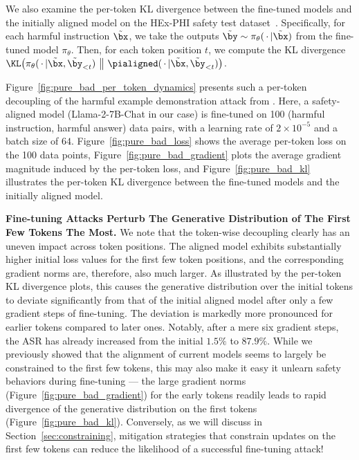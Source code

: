  
 We also examine the per-token KL divergence between the fine-tuned models and the initially aligned model on the HEx-PHI safety test dataset~\cite{hexphi}. Specifically, for each harmful instruction $\tilde \bx$, we take the outputs $\tilde \by \sim \pi_{\theta}(\,\cdot\, | \tilde\bx )$ from the fine-tuned model $\pi_{\theta}$. Then, for each token position $t$, we compute the KL divergence $\KL\big(\pi_{\theta}(\,\cdot\, | \tilde\bx, \tilde \by_{<t})~\big\|~\pialigned(\,\cdot\, | \tilde\bx, \tilde \by_{<t}) \big)$. 

Figure~\ref{fig:pure_bad_per_token_dynamics} presents such a per-token decoupling of the harmful example demonstration attack from \citet{qi2023fine}. Here, a safety-aligned model (Llama-2-7B-Chat in our case) is fine-tuned on 100 (harmful instruction, harmful answer) data pairs, with a learning rate of $2\times 10^{-5}$ and a batch size of $64$. Figure~\ref{fig:pure_bad_loss} shows the average per-token loss on the 100 data points, Figure~\ref{fig:pure_bad_gradient} plots the average gradient magnitude induced by the per-token loss, and Figure~\ref{fig:pure_bad_kl} illustrates the per-token KL divergence between the fine-tuned models and the initially aligned model.


 

 
 

\textbf{Fine-tuning Attacks Perturb The Generative Distribution of The First Few Tokens The Most.} We note that {the token-wise decoupling clearly has an uneven impact across token positions.} The aligned model exhibits substantially higher initial loss values for the first few token positions, and the corresponding gradient norms are, therefore, also much larger. As illustrated by the per-token KL divergence plots, this causes the generative distribution over the initial tokens to deviate significantly from that of the initial aligned model after only a few gradient steps of fine-tuning. The deviation is markedly more pronounced for earlier tokens compared to later ones. Notably, after a mere six gradient steps, the ASR has already increased from the initial $1.5\%$ to $87.9\%$. 
While we previously showed that the  alignment of current models seems to largely be constrained to the first few tokens, this may also make it easy it unlearn safety behaviors during fine-tuning
--- the large gradient norms (Figure~\ref{fig:pure_bad_gradient}) for the early tokens readily leads to rapid divergence of the generative distribution on the first tokens (Figure~\ref{fig:pure_bad_kl}). Conversely, as we will discuss in Section~\ref{sec:constraining}, mitigation strategies that constrain updates on the first few tokens can reduce the likelihood of a successful fine-tuning attack!

